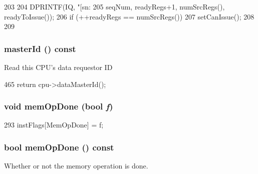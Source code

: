 \begin{DoxyCode}
203 {
204     DPRINTF(IQ, "[sn:%
205             seqNum, readyRegs+1, numSrcRegs(), readyToIssue());
206     if (++readyRegs == numSrcRegs()) {
207         setCanIssue();
208     }
209 }
\end{DoxyCode}
\hypertarget{classBaseDynInst_aef8c47228ab905833941bc0e1918c871}{
\subsubsection[{masterId}]{ masterId () const}}
\label{classBaseDynInst_aef8c47228ab905833941bc0e1918c871}
Read this CPU's data requestor ID 


\begin{DoxyCode}
465 { return cpu->dataMasterId(); }
\end{DoxyCode}
\hypertarget{classBaseDynInst_a8febf5a926e063e10aed0215d0a0fcaf}{
\subsubsection[{memOpDone}]{\setlength{\rightskip}{0pt plus 5cm}void memOpDone (bool {\em f})}}
\label{classBaseDynInst_a8febf5a926e063e10aed0215d0a0fcaf}



\begin{DoxyCode}
293 { instFlags[MemOpDone] = f; }
\end{DoxyCode}
\hypertarget{classBaseDynInst_ab5d452060f2b5236af48329f3b21b250}{
\subsubsection[{memOpDone}]{\setlength{\rightskip}{0pt plus 5cm}bool memOpDone () const}}
\label{classBaseDynInst_ab5d452060f2b5236af48329f3b21b250}
Whether or not the memory operation is done. 


